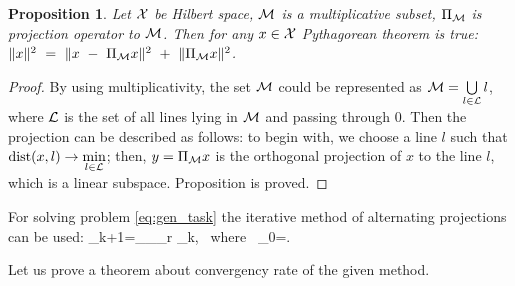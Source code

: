 \documentclass[sii]{ipart}
\newtheorem{proposition}{Proposition}
\begin{document}
\begin{proposition} \label{pythaprop}
	Let $\mathcal{X}$ be Hilbert space, $\mathcal{M}$ is a multiplicative subset, $\Pi_{\mathcal{M}}$ is projection operator to $\mathcal{M}$. Then for any $x \in \mathcal{X}$ Pythagorean theorem is true: $\|x\|^2~=~\|x~-~\Pi_{\mathcal{M}} x\|^2~+~\|\Pi_{\mathcal{M}} x\|^2$.
\end{proposition}
\begin{proof}
	By using multiplicativity, the set $\mathcal{M}$ could be represented as $\mathcal{M} = \bigcup\limits_{l \in \mathcal{L}}l$, where $\mathcal{L}$ is the set of all lines lying in $\mathcal{M}$ and passing through $0$. Then the projection can be described as follows: to begin with, we choose a line $l$ such that $\mathop{\mathrm{dist}}(x, l) \rightarrow \min\limits_{l \in \mathcal{L}}$; then, $y = \Pi_{\mathcal{M}} x$ is the orthogonal projection of $x$ to the line $l$, which is a linear subspace. Proposition is proved.
\end{proof}

For solving problem \eqref{eq:gen_task} the iterative method of alternating projections can be used:
\be
\bfY_{k+1}=\Pi_\calH \Pi_{\calM_r} \bfY_{k}, \mbox{\ where\ } \bfY_{0}=\bfX.
\ee

Let us prove a theorem about convergency rate of the given method.
\end{document}
